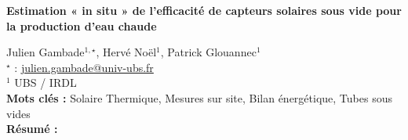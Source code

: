 


    \newpage


%
\begin{flushleft}
\addtocounter{section}{1}
{\Large \textbf{Estimation « in situ » de l'efficacité de capteurs solaires sous vide pour la production d'eau chaude}}\label{ref:29}
\end{flushleft}
%
Julien Gambade$^{1,\star}$, Hervé Noël$^{1}$, Patrick Glouannec$^{1}$\\[2mm]
$^{\star}$ \Letter : \url{julien.gambade@univ-ubs.fr}\\[2mm]
{\footnotesize $^{1}$ UBS / IRDL}\\
[4mm]
%
\noindent \textbf{Mots clés : } Solaire Thermique, Mesures sur site, Bilan énergétique, Tubes sous vides\\[4mm]
%
\noindent \textbf{Résumé : } 


